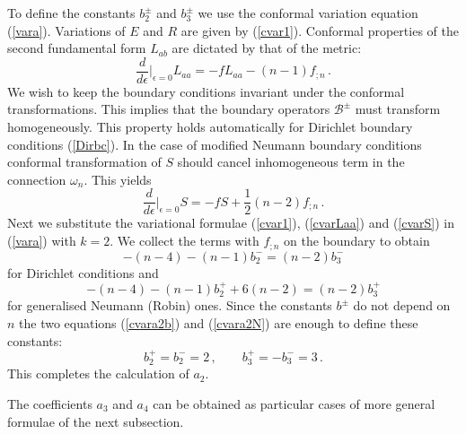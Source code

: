 To define the constants $b_2^\pm$ and $b_3^\pm$ we use the conformal
variation equation (\ref{vara}). Variations of $E$ and $R$ are given
by (\ref{cvar1}). Conformal properties of the second fundamental
form $L_{ab}$ are dictated by that of the metric:
\begin{equation}
\frac d{d\epsilon} \vert_{\epsilon =0} L_{aa}=-fL_{aa} 
-(n-1)f_{;n} \,.\label{cvarLaa}
\end{equation}
We wish to keep the boundary conditions invariant under the conformal
transformations. This implies that the boundary operators $\mathcal{B}^\pm$
must transform homogeneously. This property holds automatically for
Dirichlet boundary conditions (\ref{Dirbc}). In the case of modified
Neumann boundary conditions conformal transformation of $S$ should
cancel inhomogeneous term in the connection $\omega_n$. This yields
\begin{equation}
\frac d{d\epsilon} \vert_{\epsilon =0}S=-fS+\frac 12 (n-2)f_{;n}\,.
\label{cvarS}
\end{equation}
Next we substitute the variational formulae (\ref{cvar1}), (\ref{cvarLaa})
and (\ref{cvarS}) in (\ref{vara}) with $k=2$. We collect the
terms with $f_{;n}$ on the boundary to obtain
\begin{equation}
-(n-4)-(n-1)b_2^-=(n-2) b_3^- \label{cvara2b}
\end{equation}
for Dirichlet conditions and
\begin{equation}
-(n-4)-(n-1)b_2^+ +6(n-2)=(n-2) b_3^+ \label{cvara2N}
\end{equation}
for generalised Neumann (Robin) ones. Since the constants $b^\pm$ do
not depend on $n$ the two equations (\ref{cvara2b}) and (\ref{cvara2N})
are enough to define these constants:
\begin{equation}
b_2^+=b_2^-=2\,,\qquad b_3^+=-b_3^-=3 \,.\label{bpm23}
\end{equation}
This completes the calculation of $a_2$. 

The coefficients $a_3$ and $a_4$ can be obtained as particular
cases of more general formulae of the next subsection.
